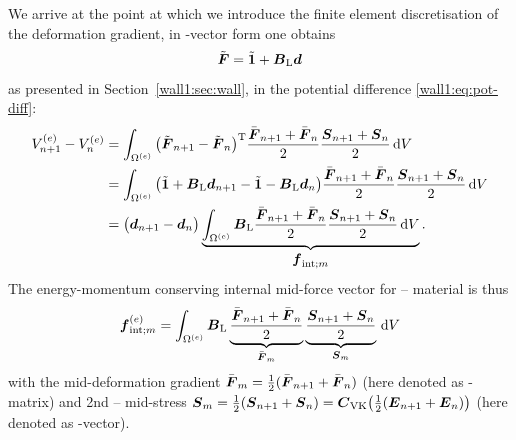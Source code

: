We arrive at the point at which we introduce the finite element discretisation
of the deformation gradient, \ie{} in -vector form one obtains
\begin{equation}
   \tilde{\boldsymbol{F}}
   = \tilde{\boldsymbol{1}} + \boldsymbol{B}_{\text{L}} \boldsymbol{d}
\end{equation}
as presented in Section~\ref{wall1:sec:wall}, in the potential difference
\eqref{wall1:eq:pot-diff}:
\begin{equation}
\begin{aligned}
   V_{n+1}^{(e)} - V_n^{(e)}
&  = \int_{\Omega^{(e)}} \big( \tilde{\boldsymbol{F}}_{n+1} - \tilde{\boldsymbol{F}}_{n} \big)^{\mathrm{T}}
     \frac{\bar{\boldsymbol{F}}_{n+1} + \bar{\boldsymbol{F}}_{n}}{2}
     \frac{\boldsymbol{S}_{n+1} + \boldsymbol{S}_n}{2} 
     \, \mathrm{d} V
\\
&  = \int_{\Omega^{(e)}}
     \big( \tilde{\boldsymbol{1}} + \boldsymbol{B}_{\text{L}} \boldsymbol{d}_{n+1} 
           - \tilde{\boldsymbol{1}} - \boldsymbol{B}_{\text{L}} \boldsymbol{d}_n \big)
     \frac{\bar{\boldsymbol{F}}_{n+1} + \bar{\boldsymbol{F}}_{n}}{2}
     \frac{\boldsymbol{S}_{n+1} + \boldsymbol{S}_n}{2} 
     \, \mathrm{d} V
\\
&  = \big( \boldsymbol{d}_{n+1} - \boldsymbol{d}_n \big)
     \underbrace{\int_{\Omega^{(e)}}
     \boldsymbol{B}_{\text{L}} \frac{\bar{\boldsymbol{F}}_{n+1} + \bar{\boldsymbol{F}}_{n}}{2}
     \frac{\boldsymbol{S}_{n+1} + \boldsymbol{S}_n}{2} 
     \, \mathrm{d} V}_{\displaystyle\boldsymbol{f}_{\text{int};m}}
     \text{.}
\end{aligned}
\end{equation}
The energy-momentum conserving internal mid-force vector for -- material is thus
\begin{equation}\label{wall1:eq:mid-internal-pure-disp-vkmat}
   \boldsymbol{f}_{\text{int};m}^{(e)}
   = \int_{\Omega^{(e)}}
     \boldsymbol{B}_{\text{L}} \underbrace{\frac{\bar{\boldsymbol{F}}_{n+1} + \bar{\boldsymbol{F}}_{n}}{2}}_{\bar{\boldsymbol{F}}_m}
     \underbrace{\frac{\boldsymbol{S}_{n+1} + \boldsymbol{S}_n}{2}}_{\boldsymbol{S}_m}
     \, \mathrm{d} V
\end{equation}
with the mid-deformation gradient $\bar{\boldsymbol{F}}_m=\frac{1}{2}(\bar{\boldsymbol{F}}_{n+1} +
\bar{\boldsymbol{F}}_{n})$ (here denoted as -matrix) and 2nd
-- mid-stress $\boldsymbol{S}_m =
\frac{1}{2}(\boldsymbol{S}_{n+1} +
\boldsymbol{S}_n)=\boldsymbol{C}_{\text{VK}}\big(\frac{1}{2}(\boldsymbol{E}_{n+1} + \boldsymbol{E}_n)\big)$ (here denoted as -vector).


